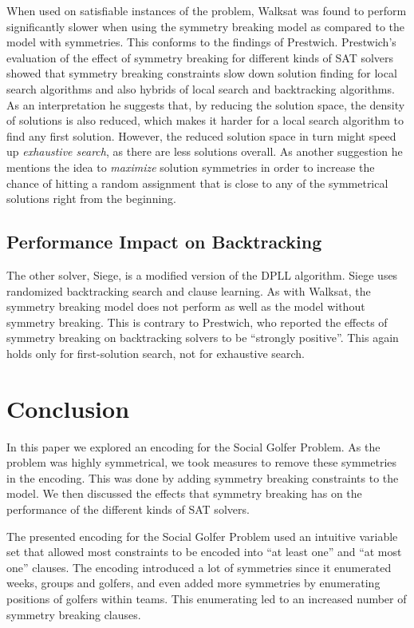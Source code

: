 \documentclass[a4paper]{scrartcl}
\begin{document}
When used on satisfiable instances of the problem, Walksat was found to perform significantly slower when using the symmetry breaking model as compared to the model with symmetries. This conforms to the findings of Prestwich\cite{Prestwich}. Prestwich's evaluation of the effect of symmetry breaking for different kinds of SAT solvers showed that symmetry breaking constraints slow down solution finding for local search algorithms and also hybrids of local search and backtracking algorithms. As an interpretation he suggests that, by reducing the solution space, the density of solutions is also reduced, which makes it harder for a local search algorithm to find any first solution. However, the reduced solution space in turn might speed up \emph{exhaustive search}, as there are less solutions overall. As another suggestion he mentions the idea to \emph{maximize} solution symmetries in order to increase the chance of hitting a random assignment that is close to any of the symmetrical solutions right from the beginning.


\subsection{Performance Impact on Backtracking}

The other solver, Siege, is a modified version of the DPLL algorithm\cite{DPLL}. Siege uses randomized backtracking search and clause learning. As with Walksat, the symmetry breaking model does not perform as well as the model without symmetry breaking. This is contrary to Prestwich, who reported the effects of symmetry breaking on backtracking solvers to be ``strongly positive''. This again holds only for first-solution search, not for exhaustive search.


\section{Conclusion}

In this paper we explored an encoding for the Social Golfer Problem. As the problem was highly symmetrical, we took measures to remove these symmetries in the encoding. This was done by adding symmetry breaking constraints to the model. We then discussed the effects that symmetry breaking has on the performance of the different kinds of SAT solvers.

The presented encoding for the Social Golfer Problem used an intuitive variable set that allowed most constraints to be encoded into ``at least one'' and ``at most one'' clauses. The encoding introduced a lot of symmetries since it enumerated weeks, groups and golfers, and even added more symmetries by enumerating positions of golfers within teams. This enumerating led to an increased number of symmetry breaking clauses.
\end{document}
